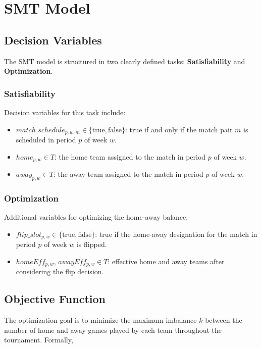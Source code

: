\section{SMT Model}

\subsection{Decision Variables}

The SMT model is structured in two clearly defined tasks: \textbf{Satisfiability} and \textbf{Optimization}.

\subsubsection{Satisfiability}

Decision variables for this task include:
\begin{itemize}
    \item $match\_schedule_{p,w,m} \in \{\text{true}, \text{false}\}$: true if and only if the match pair $m$ is scheduled in period $p$ of week $w$.
    \item $home_{p,w} \in T$: the home team assigned to the match in period $p$ of week $w$.
    \item $away_{p,w} \in T$: the away team assigned to the match in period $p$ of week $w$.
\end{itemize}

\subsubsection{Optimization}

Additional variables for optimizing the home-away balance:
\begin{itemize}
    \item $flip\_slot_{p,w} \in \{\text{true}, \text{false}\}$: true if the home-away designation for the match in period $p$ of week $w$ is flipped.
    \item $homeEff_{p,w},\, awayEff_{p,w} \in T$: effective home and away teams after considering the flip decision.
\end{itemize}

\subsection{Objective Function}

The optimization goal is to minimize the maximum imbalance $k$ between the number of home and away games played by each team throughout the tournament. Formally,

